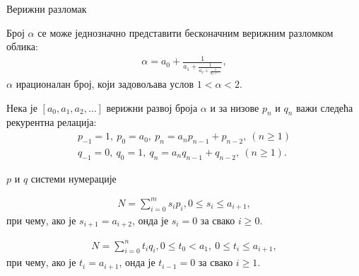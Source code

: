 \documentclass[10pt]{beamer}
\theoremstyle{remark}
\theoremstyle{definition}
\begin{document}
	\begin{frame}{Верижни разломак}
		\begin{tcolorbox}
			Број $ \alpha $ се може једнозначно представити бесконачним верижним разломком облика:
			\begin{eqnarray}
				\alpha = a_{0} + \frac{1}{a_{1} + \frac{1}{a_{2} + \frac{1}{a_{3} + \ldots}}},
			\end{eqnarray}
			$ \alpha $ ирационалан број, који задовољава услов $ 1 < \alpha < 2 $.
		\end{tcolorbox}
	
		\begin{tcolorbox}
			Нека је $ [a_{0}, a_{1}, a_{2}, \ldots] $ верижни развој броја $ \alpha $ и за низове $ p_{n} $ и $ q_{n} $ важи следећа рекурентна релација:
			\begin{eqnarray}
			p_{-1} = 1,\ p_{0} = a_{0},\ p_{n} = a_{n}p_{n-1} + p_{n-2},\ (n \geq 1 )\\
			q_{-1} = 0,\ q_{0} = 1,\ q_{n} = a_{n}q_{n-1} + q_{n-2},\ (n \geq 1 ).
			\end{eqnarray}
		\end{tcolorbox}
	\end{frame}

	\begin{frame}{$ p $ и $ q $ системи нумерације}
		\begin{tcolorbox}[title=$ p $-систем]
			\begin{eqnarray}
				N = \sum_{i=0}^{m} s_{i}p_{i}, 0 \leq s_{i} \leq a_{i+1},
			\end{eqnarray}	
			при чему, ако је $ s_{i+1} = a_{i+2} $, онда је $ s_{i} = 0  $ за свако $ i \geq 0 $.
		\end{tcolorbox}
		
		\begin{tcolorbox}[title=$ q $-систем]
			\begin{eqnarray}
			N = \sum_{i=0}^{n} t_{i}q_{i}, 0 \leq t_{0} < a_{1},\ 0 \leq t_{i} \leq a_{i+1},
			\end{eqnarray}
			при чему, ако је $ t_{i} = a_{i+1} $, онда је $ t_{i-1} = 0 $ за свако $ i \geq 1 $.
		\end{tcolorbox}
	\end{frame}
	
\end{document}
